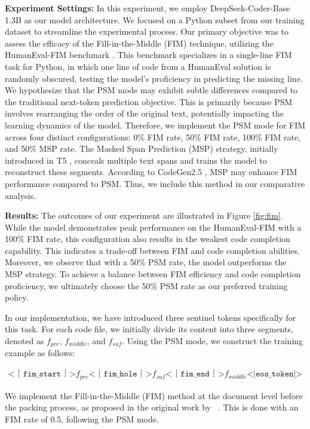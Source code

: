 \textbf{Experiment Settings:} In this experiment, we employ DeepSeek-Coder-Base 1.3B as our model architecture. We focused on a Python subset from our training dataset to streamline the experimental process. Our primary objective was to assess the efficacy of the Fill-in-the-Middle (FIM) technique, utilizing the HumanEval-FIM benchmark \citep{fried2022incoder}. This benchmark specializes in a single-line FIM task for Python, in which one line of code from a HumanEval solution is randomly obscured, testing the model's proficiency in predicting the missing line. We hypothesize that the PSM mode may exhibit subtle differences compared to the traditional next-token prediction objective. This is primarily because PSM involves rearranging the order of the original text, potentially impacting the learning dynamics of the model. Therefore, we implement the PSM mode for FIM across four distinct configurations: 0\% FIM rate, 50\% FIM rate, 100\% FIM rate, and 50\% MSP rate. The Masked Span Prediction (MSP) strategy, initially introduced in T5 \citep{raffel2023exploring}, conceals multiple text spans and trains the model to reconstruct these segments. According to CodeGen2.5 \citep{nijkamp2023codegen2}, MSP may enhance FIM performance compared to PSM. Thus, we include this method in our comparative analysis.

\textbf{Results:} The outcomes of our experiment are illustrated in Figure \ref{fig:fim}. While the model demonstrates peak performance on the HumanEval-FIM with a 100\% FIM rate, this configuration also results in the weakest code completion capability. This indicates a trade-off between FIM and code completion abilities. Moreover, we observe that with a 50\% PSM rate, the model outperforms the MSP strategy. To achieve a balance between FIM efficiency and code completion proficiency, we ultimately choose the 50\% PSM rate as our preferred training policy.  

In our implementation, we have introduced three sentinel tokens specifically for this task. For each code file, we initially divide its content into three segments, denoted as $f_{pre}$, $f_{middle}$, and $f_{suf}$. Using the PSM mode, we construct the training example as follows:

\begin{align}
\texttt{<｜fim\_start｜>}f_{pre}\texttt{<｜fim\_hole｜>}f_{suf}\texttt{<｜fim\_end｜>}f_{middle}\texttt{<|eos\_token|>} \nonumber
\end{align}

We implement the Fill-in-the-Middle (FIM) method at the document level before the packing process, as proposed in the original work by ~\cite{bavarian2022efficient}. This is done with an FIM rate of 0.5, following the PSM mode.

